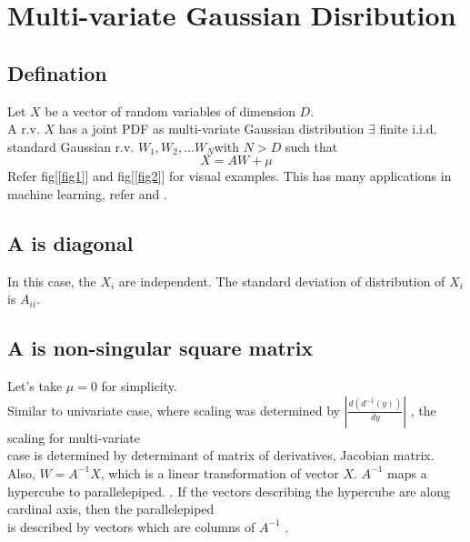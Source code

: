 \documentclass{article}
\begin{document}
\section{Multi-variate Gaussian Disribution }
\subsection{Defination}
Let $X$ be a vector of random variables of dimension $D$.\\
A r.v. $X$ has a joint PDF as multi-variate Gaussian distribution $\exists$ finite i.i.d. standard Gaussian
\clearpage
\thispagestyle{fancy}
\fancyhf{}
r.v. $W_1, W_2, . . . W_N $with $N > D$ such that \\
\[X = AW + \mu\] 
Refer fig[\ref{fig1}] and fig[\ref{fig2}] for visual examples. This has many applications in machine learning, refer \cite{2} and \cite{3}.\\


\subsection{ A is diagonal }
In this case, the $X_i$ are independent. The standard deviation of distribution of $X_i$
is $A_{ii}$.

\subsection{A is non-singular square matrix }
Let’s take $\mu = 0$ for simplicity.\\
Similar to univariate case, where scaling was determined by
$|\frac{d(d^{-1}(y))}{dy}|$
, the scaling for multi-variate\\
case is determined by determinant of matrix of derivatives, Jacobian matrix.\\
Also, $W=A^{-1}X$, which is a linear transformation of vector $X$. $A^{-1}$ maps a hypercube to parallelepiped.
. If the vectors describing the hypercube are along cardinal axis, then the parallelepiped\\
is described by vectors which are columns of $A^{-1}$
.\\%
\end{document}
